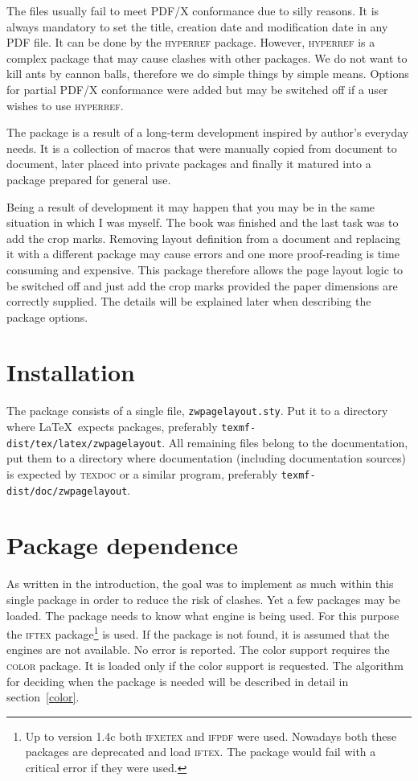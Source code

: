 \documentclass[11pt]{article}
\let\pkg\textsc
\begin{document}
The files usually fail to meet PDF/X conformance due to silly reasons. It is always mandatory to
set the title, creation date and modification date in any PDF file. It can be done by the
\pkg{hyperref} package. However, \pkg{hyperref} is a complex package that may cause clashes with
other packages. We do not want to kill ants by cannon balls, therefore we do simple things by simple
means. Options for partial PDF/X conformance were added but may be switched off if a user wishes to
use \pkg{hyperref}.

The package is a result of a long-term development inspired by author's everyday needs. It is a
collection of macros that were manually copied from document to document, later placed into private
packages and finally it matured into a package prepared for general use.

Being a result of development it may happen that you may be in the same situation in which I was
myself. The book was finished and the last task was to add the crop marks. Removing layout
definition from a document and replacing it with a different package may cause errors and one more
proof-reading is time consuming and expensive. This package therefore allows the page layout logic
to be switched off and just add the crop marks provided the paper dimensions are correctly
supplied. The details will be explained later when describing the package options.

\section{Installation}\label{installation}
The package consists of a single file, \texttt{zwpagelayout.sty}. Put it to a directory where
\LaTeX\ expects packages, preferably \texttt{texmf-dist/tex/latex/zwpagelayout}. All remaining
files belong to the documentation, put them to a directory where documentation (including
documentation sources) is expected by \pkg{texdoc} or a similar program, preferably
\texttt{texmf-dist/doc/zwpagelayout}.

\section{Package dependence}
As written in the introduction, the goal was to implement as much within this single package in
order to reduce the risk of clashes. Yet a few packages may be loaded. The package needs to know
what engine is being used. For this purpose the \pkg{iftex} package\footnote{Up to version 1.4c
both \pkg{ifxetex} and \pkg{ifpdf} were used. Nowadays both these packages are deprecated and load
\pkg{iftex}. The package would fail with a critical error if they were used.} is used. If
the package is not found, it is assumed that the engines are not available.
No error is reported. The color support requires the \pkg{color} package. It is loaded only if the
color support is requested. The algorithm for deciding when the package is needed will be described
in detail in section~\ref{color}.
\end{document}
